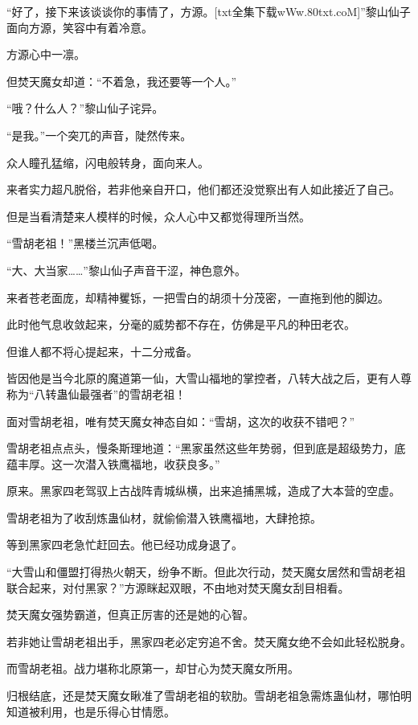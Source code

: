 
\begin{this_body}

“好了，接下来该谈谈你的事情了，方源。[txt全集下载wWw.80txt.coM]”黎山仙子面向方源，笑容中有着冷意。

方源心中一凛。

但焚天魔女却道：“不着急，我还要等一个人。”

“哦？什么人？”黎山仙子诧异。

“是我。”一个突兀的声音，陡然传来。

众人瞳孔猛缩，闪电般转身，面向来人。

来者实力超凡脱俗，若非他亲自开口，他们都还没觉察出有人如此接近了自己。

但是当看清楚来人模样的时候，众人心中又都觉得理所当然。

“雪胡老祖！”黑楼兰沉声低喝。

“大、大当家……”黎山仙子声音干涩，神色意外。

来者苍老面庞，却精神矍铄，一把雪白的胡须十分茂密，一直拖到他的脚边。

此时他气息收敛起来，分毫的威势都不存在，仿佛是平凡的种田老农。

但谁人都不将心提起来，十二分戒备。

皆因他是当今北原的魔道第一仙，大雪山福地的掌控者，八转大战之后，更有人尊称为“八转蛊仙最强者”的雪胡老祖！

面对雪胡老祖，唯有焚天魔女神态自如：“雪胡，这次的收获不错吧？”

雪胡老祖点点头，慢条斯理地道：“黑家虽然这些年势弱，但到底是超级势力，底蕴丰厚。这一次潜入铁鹰福地，收获良多。”

原来。黑家四老驾驭上古战阵青城纵横，出来追捕黑城，造成了大本营的空虚。

雪胡老祖为了收刮炼蛊仙材，就偷偷潜入铁鹰福地，大肆抢掠。

等到黑家四老急忙赶回去。他已经功成身退了。

“大雪山和僵盟打得热火朝天，纷争不断。但此次行动，焚天魔女居然和雪胡老祖联合起来，对付黑家？”方源眯起双眼，不由地对焚天魔女刮目相看。

焚天魔女强势霸道，但真正厉害的还是她的心智。

若非她让雪胡老祖出手，黑家四老必定穷追不舍。焚天魔女绝不会如此轻松脱身。

而雪胡老祖。战力堪称北原第一，却甘心为焚天魔女所用。

归根结底，还是焚天魔女瞅准了雪胡老祖的软肋。雪胡老祖急需炼蛊仙材，哪怕明知道被利用，也是乐得心甘情愿。


\end{this_body}
